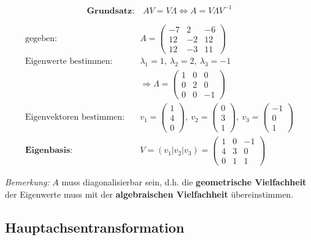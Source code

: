 \documentclass[11pt]{article}
\begin{document}
\begin{equation*}
	\textbf{Grundsatz:}\quad AV = V\Lambda \Leftrightarrow A = V\Lambda V^{-1}
\end{equation*}

\begin{equation*}
\begin{split}
	\text{gegeben:} \quad & A = \begin{pmatrix}
		-7 & 2 & -6 \\ 12 & -2 & 12 \\ 12 & -3 & 11
	\end{pmatrix} \\
	\text{Eigenwerte bestimmen:} \quad & \lambda_1 = 1,\ \lambda_2 = 2,\ \lambda_3 = -1 \\
	& \Rightarrow \Lambda = \begin{pmatrix}
		1 & 0 & 0 \\ 0 & 2 & 0 \\ 0 & 0 & -1
	\end{pmatrix} \\
	\text{Eigenvektoren bestimmen:} \quad & v_1 = \begin{pmatrix}
		1 \\ 4 \\ 0
	\end{pmatrix},\ v_2 = \begin{pmatrix}
		0 \\ 3 \\ 1
	\end{pmatrix},\ v_3 = \begin{pmatrix}
		-1 \\ 0 \\ 1
	\end{pmatrix} \\
	\textbf{Eigenbasis:} \quad & V = (v_1|v_2|v_3) = \begin{pmatrix}
		1 & 0 & -1 \\ 4 & 3 & 0 \\ 0 & 1 & 1
	\end{pmatrix}
\end{split}
\end{equation*}

\emph{Bemerkung:} $A$ muss diagonalisierbar sein, d.h. die \textbf{geometrische Vielfachheit} der Eigenwerte muss mit der \textbf{algebraischen Vielfachheit} {\"u}bereinstimmen.

\subsection{Hauptachsentransformation}
\end{document}
